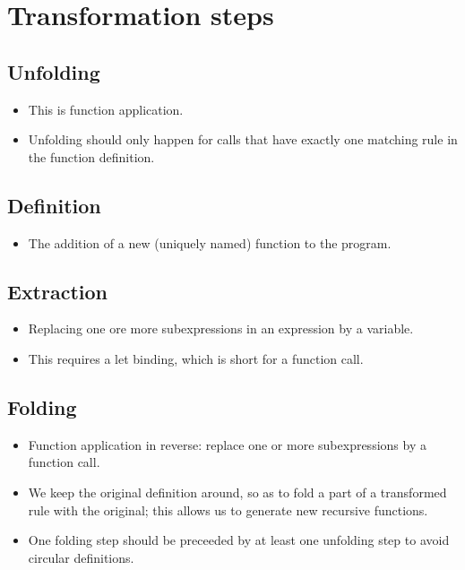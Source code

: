 \section{Transformation steps}

\subsection{Unfolding}

\begin{itemize}

\item This is function application.

\item Unfolding should only happen for calls that have exactly one matching
rule in the function definition.

\end{itemize}

\subsection{Definition}

\begin{itemize}

\item The addition of a new (uniquely named) function to the program.

\end{itemize}

\subsection{Extraction}

\begin{itemize}

\item Replacing one ore more subexpressions in an expression by a variable.

\item This requires a let binding, which is short for a function call.

\end{itemize}

\subsection{Folding}

\begin{itemize}

\item Function application in reverse: replace one or more subexpressions by a
function call.

\item We keep the original definition around, so as to fold a part of a
transformed rule with the original; this allows us to generate new recursive
functions.

\item One folding step should be preceeded by at least one unfolding step to
avoid circular definitions.

\end{itemize}

